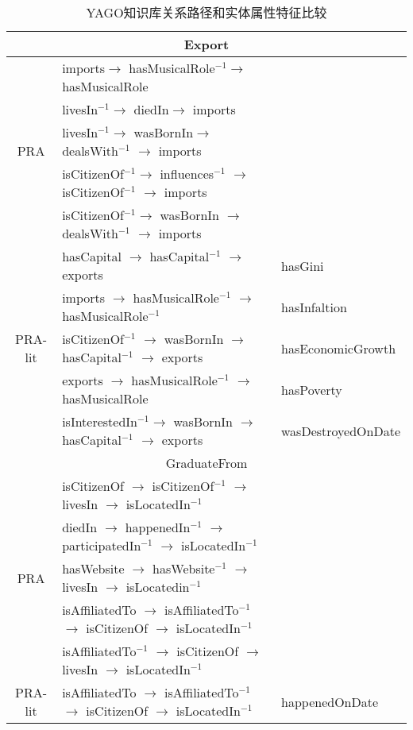 \begin{table}[htbp]
  \centering
  \caption{YAGO知识库关系路径和实体属性特征比较}
    \begin{tabular}{cp{10.3cm}|p{3.7cm}|}
    \hline
    \multicolumn{3}{c}{Export} \\
    \hline
    \multirow{5}[2]{*}{PRA} & imports$\to$ hasMusicalRole$^{-1}$$\to$ hasMusicalRole &  \\
          & livesIn$^{-1}$$\to$ diedIn$\to$ imports  &  \\
          & livesIn$^{-1}$$\to$ wasBornIn$\to$ dealsWith$^{-1}$ $\to$ imports &  \\
          & isCitizenOf$^{-1}$$\to$ influences$^{-1}$ $\to$ isCitizenOf$^{-1}$ $\to$ imports &  \\
          & isCitizenOf$^{-1}$$\to$ wasBornIn $\to$ dealsWith$^{-1}$ $\to$ imports &  \\
    \hline
    \multirow{5}[2]{*}{PRA-lit} & hasCapital $\to$ hasCapital$^{-1}$ $\to$ exports & hasGini \\
          & imports $\to$ hasMusicalRole$^{-1}$ $\to$ hasMusicalRole$^{-1}$ & hasInfaltion \\
          & isCitizenOf$^{-1}$ $\to$ wasBornIn $\to$ hasCapital$^{-1}$ $\to$ exports & hasEconomicGrowth \\
          & exports $\to$ hasMusicalRole$^{-1}$ $\to$ hasMusicalRole & hasPoverty \\
          & isInterestedIn$^{-1}$$\to$ wasBornIn $\to$ hasCapital$^{-1}$ $\to$ exports& wasDestroyedOnDate \\
    \hline
    \multicolumn{3}{c}{GraduateFrom} \\
    \hline
    \multirow{5}[2]{*}{PRA} & isCitizenOf $\to$ isCitizenOf$^{-1}$ $\to$ livesIn $\to$ isLocatedIn$^{-1}$&  \\
          & diedIn $\to$ happenedIn$^{-1}$ $\to$ participatedIn$^{-1}$ $\to$ isLocatedIn$^{-1}$ &  \\
          & hasWebsite $\to$ hasWebsite$^{-1}$ $\to$ livesIn $\to$ isLocatedin$^{-1}$ &  \\
          & isAffiliatedTo $\to$ isAffiliatedTo$^{-1}$ $\to$ isCitizenOf $\to$ isLocatedIn$^{-1}$ &  \\
          & isAffiliatedTo$^{-1}$ $\to$ isCitizenOf $\to$ livesIn $\to$ isLocatedIn$^{-1}$ &  \\
    \hline
    \multirow{5}[2]{*}{PRA-lit} & isAffiliatedTo $\to$ isAffiliatedTo$^{-1}$ $\to$ isCitizenOf $\to$ isLocatedIn$^{-1}$& happenedOnDate\\

\end{tabular}
\end{table}
